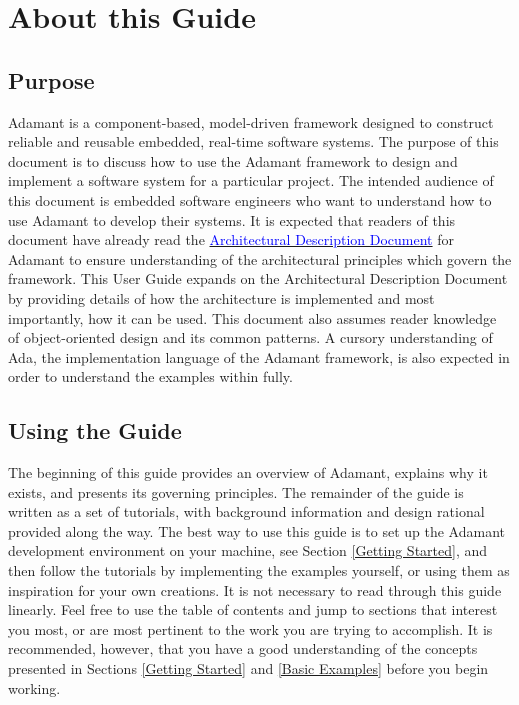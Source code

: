 \newpage
{}
\section{About this Guide}

\subsection{Purpose}

Adamant is a component-based, model-driven framework designed to construct reliable and reusable embedded, real-time software systems. The purpose of this document is to discuss how to use the Adamant framework to design and implement a software system for a particular project. The intended audience of this document is embedded software engineers who want to understand how to use Adamant to develop their systems. It is expected that readers of this document have already read the \href{https://github.com/lasp/adamant/blob/main/doc/architecture_description_document/architecture_description_document.pdf}{\textcolor{blue}{Architectural Description Document}} for Adamant to ensure understanding of the architectural principles which govern the framework. This User Guide expands on the Architectural Description Document by providing details of how the architecture is implemented and most importantly, how it can be used. This document also assumes reader knowledge of object-oriented design and its common patterns. A cursory understanding of Ada, the implementation language of the Adamant framework, is also expected in order to understand the examples within fully.

\subsection{Using the Guide}

The beginning of this guide provides an overview of Adamant, explains why it exists, and presents its governing principles. The remainder of the guide is written as a set of tutorials, with background information and design rational provided along the way. The best way to use this guide is to set up the Adamant development environment on your machine, see Section \ref{Getting Started}, and then follow the tutorials by implementing the examples yourself, or using them as inspiration for your own creations. It is not necessary to read through this guide linearly. Feel free to use the table of contents and jump to sections that interest you most, or are most pertinent to the work you are trying to accomplish. It is recommended, however, that you have a good understanding of the concepts presented in Sections \ref{Getting Started} and \ref{Basic Examples} before you begin working. \\

